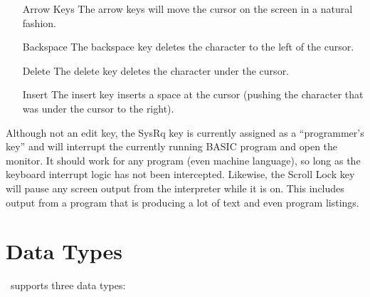 \documentclass{report}
\begin{document}
    \begin{itemize}
        \item[Arrow Keys] The arrow keys will move the cursor on the screen in a natural fashion.
        \item[Backspace] The backspace key deletes the character to the left of the cursor.
        \item[Delete] The delete key deletes the character under the cursor.
        \item[Insert] The insert key inserts a space at the cursor (pushing the character that was under the cursor to the right).    
    \end{itemize}

    Although not an edit key, the SysRq key is currently assigned as a ``programmer's key'' and will interrupt
    the currently running BASIC program and open the monitor. It should work for any program (even machine language), so
    long as the keyboard interrupt logic has not been intercepted. Likewise, the Scroll Lock key will pause any screen
    output from the interpreter while it is on. This includes output from a program that is producing a lot of text and
    even program listings.

    \section*{Data Types}

    \BASIC\ supports three data types:
\end{document}
